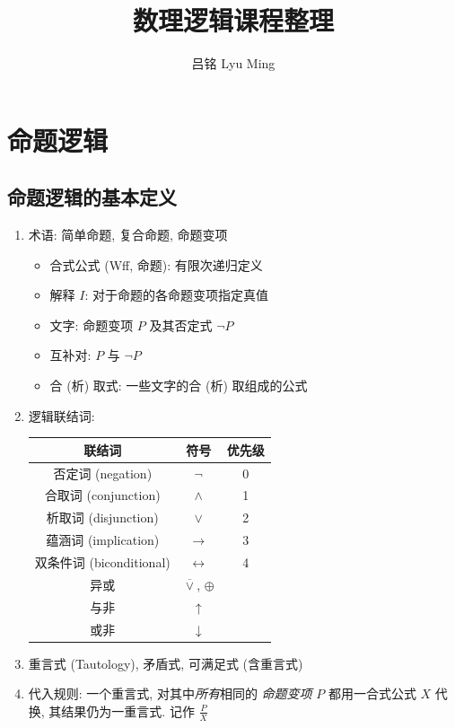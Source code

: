 \documentclass[11pt,a4paper,twocolumn,fleqn]{article} %
\begin{document}
\title{数理逻辑课程整理}
\author{吕铭 Lyu Ming}
\maketitle
\tableofcontents
\section{命题逻辑} %
\label{sec:propositional_logic}
\subsection{命题逻辑的基本定义} %
\label{sub:def}
\begin{enumerate}
	\item 术语: 简单命题, 复合命题, 命题变项
	\begin{itemize}
		\item 合式公式 (Wff, 命题): 有限次递归定义
		\item 解释 $I$: 对于命题的各命题变项指定真值
		\item 文字: 命题变项 $P$ 及其否定式 $\lnot P$
		\item 互补对: $P$ 与 $\lnot P$
		\item 合 (析) 取式: 一些文字的合 (析) 取组成的公式
	\end{itemize}
	\item 逻辑联结词: \\
	\begin{centering}
	\begin{tabular}{ccc}
		联结词 & 符号 & 优先级 \\\hline
		否定词 (negation)     & $\lnot$ & 0 \\
		合取词 (conjunction) & $\land$  & 1 \\
		析取词 (disjunction) & $\lor$   & 2 \\
		蕴涵词 (implication) & $\to$    & 3 \\
		双条件词 (biconditional) & $\leftrightarrow$ & 4 \\\hline
		异或 & $\overline\lor$, $\oplus$ \\
		与非 & $\uparrow$ \\
		或非 & $\downarrow$
	\end{tabular}
	\end{centering}
	\item 重言式 (Tautology), 矛盾式, 可满足式 (含重言式)
	\item 代入规则: 一个重言式, 对其中\emph{所有}相同的
	\emph{命题变项} $P$ 都用一合式公式 $X$ 代换, 其结果仍为一重言式. 记作
	$\frac{P}{X}$
\end{enumerate}
\end{document}
